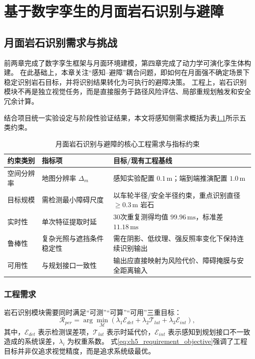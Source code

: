 \chapter{基于数字孪生的月面岩石识别与避障}
\label{ch:perception}

\section{月面岩石识别需求与挑战}
\label{sec:ch5_requirements}

前两章完成了数字孪生框架与月面环境建模，第四章完成了动力学可演化孪生体构建。
在此基础上，本章关注“感知--避障”耦合问题，即如何在月面强不确定场景下稳定识别岩石目标，并将识别结果转化为可执行的避障决策。
工程上，岩石识别模块不再是独立视觉任务，而是直接服务于路径风险评估、局部重规划触发和安全冗余计算。

结合项目统一实验设定与阶段性验证结果，本文将感知侧需求概括为表\ref{tab:ch5_requirements_metrics}所示五类约束。

\begin{table}[H]
	\centering
	\small
	\caption{月面岩石识别与避障的核心工程需求与指标约束}
	\label{tab:ch5_requirements_metrics}
	\begin{tabular}{p{}p{}p{}}
		\toprule
		约束类别 & 指标项 & 目标/现有工程基线 \\
		\midrule
		空间分辨率 & 地图分辨率 $\Delta_m$ & 感知实验配置 $0.1\,\mathrm{m}$；端到端推演配置 $1.0\,\mathrm{m}$ \\
		目标规模 & 需检测最小障碍尺度 & 以车轮半径/安全半径约束，重点识别直径 $\ge 0.3\,\mathrm{m}$ 岩石 \\
		实时性 & 单次特征提取时延 & 30次重复测得均值 $99.96\,\mathrm{ms}$，标准差 $11.18\,\mathrm{ms}$ \\
		鲁棒性 & 复杂光照与遮挡条件稳定性 & 需在阴影、低纹理、强反照率变化下保持连续识别输出 \\
		可用性 & 与规划接口一致性 & 输出应直接映射为风险代价、障碍掩膜与安全距离输入 \\
		\bottomrule
	\end{tabular}
\end{table}

\subsection{工程需求}

岩石识别模块需要同时满足“可测”“可算”“可用”三重目标：
\begin{equation}
\mathcal{R}_{per}=\arg\min_{\mathcal{M}}
\left(
\lambda_1 \mathcal{E}_{det}+
\lambda_2 \mathcal{T}_{lat}+
\lambda_3 \mathcal{E}_{int}
\right),
\label{eq:ch5_requirement_objective}
\end{equation}
其中，$\mathcal{E}_{det}$ 表示检测误差项，$\mathcal{T}_{lat}$ 表示时延代价，$\mathcal{E}_{int}$ 表示感知到规划接口不一致造成的系统误差，$\lambda_i$ 为权重系数。
式\eqref{eq:ch5_requirement_objective}强调了工程目标并非仅追求视觉精度，而是追求系统级最优。

